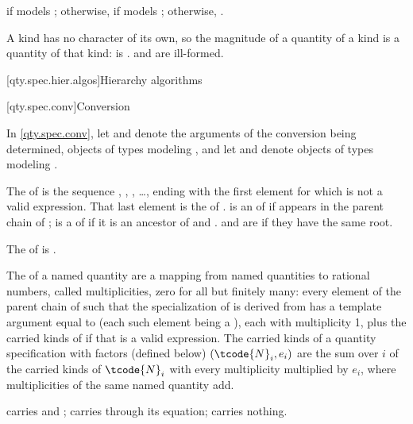 \begin{itemdescr}
\pnum
\returns
{} if  models ;
otherwise,  if  models ;
otherwise, .

\pnum
\begin{note}
A kind has no character of its own,
so the magnitude of a quantity of a kind is a quantity of that kind:
 is .
 and  are ill-formed.
\end{note}
\end{itemdescr}

[qty.spec.hier.algos]{Hierarchy algorithms}

[qty.spec.conv]{Conversion}

\pnum
In \ref{qty.spec.conv}, let  and  denote
the arguments of the conversion being determined,
objects of types modeling , and
let  and  denote
objects of types modeling .

\pnum
The  of  is the sequence
, , , \ldots,
ending with the first element  for which  is not a valid expression.
That last element is the  of .
 is an  of  if
 appears in the parent chain of ;
 is a  of  if
it is an ancestor of  and .
 and  are  if they have the same root.

\pnum
The  of  is
.

\pnum
The  of a named quantity  are a mapping from named quantities
to rational numbers, called multiplicities, zero for all but finitely many:
every element  of the parent chain of  such that
the specialization of   is derived from
has a template argument equal to 
(each such element being a ), each with multiplicity 1,
plus the carried kinds of 
if that is a valid expression.
The carried kinds of a quantity specification  with factors (defined below) $(\tcode{N}_i, e_i)$ are
the sum over $i$ of the carried kinds of $\tcode{N}_i$ with every multiplicity multiplied by $e_i$,
where multiplicities of the same named quantity add.
\begin{example}
 carries  and ;
 carries  through its equation;
 carries nothing.
\end{example}

